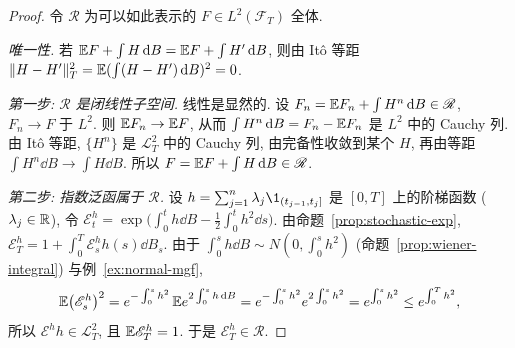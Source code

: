 \begin{proof}
令 $\mathscr{R}$ 为可以如此表示的 $F\in L^2(\mathcal{F}_T)$ 全体.

\emph{唯一性.} 若 $\mathbb{E} F+\int H\mathop{}\!\mathrm{d} B=\mathbb{E} F+\int H'\mathop{}\!\mathrm{d} B$, 则由 It\^o 等距 $\lVert H-H'\rVert_T^2=\mathbb{E}(\int(H-H')\mathop{}\!\mathrm{d} B)^2=0$.

\emph{第一步: $\mathscr{R}$ 是闭线性子空间.} 线性是显然的. 设 $F_n=\mathbb{E} F_n+\int H^n\mathop{}\!\mathrm{d} B\in\mathscr{R}$, $F_n\to F$ 于 $L^2$. 则 $\mathbb{E} F_n\to\mathbb{E} F$, 从而 $\int H^n\mathop{}\!\mathrm{d} B=F_n-\mathbb{E} F_n$ 是 $L^2$ 中的 Cauchy 列. 由 It\^o 等距, $\{H^n\}$ 是 $\mathscr{L}^2_T$ 中的 Cauchy 列, 由完备性收敛到某个 $H$, 再由等距 $\int H^n\dd B\to\int H\dd B$. 所以 $F=\mathbb{E} F+\int H\mathop{}\!\mathrm{d} B\in\mathscr{R}$.

\emph{第二步: 指数泛函属于 $\mathscr{R}$.} 设 $h=\sum_{j=1}^n\lambda_j\1_{(t_{j-1},t_j]}$ 是 $[0,T]$ 上的阶梯函数 ($\lambda_j\in\mathbb{R}$), 令 $\mathscr{E}^h_t=\exp\big(\int_0^th\dd B-\frac{1}{2}\int_0^th^2\dd s\big)$. 由命题~\ref{prop:stochastic-exp}, $\mathscr{E}^h_T=1+\int_0^T\mathscr{E}^h_sh(s)\dd B_s$. 由于 $\int_0^sh\dd B\sim N(0,\int_0^sh^2)$ (命题~\ref{prop:wiener-integral}) 与例~\ref{ex:normal-mgf},
\[
\mathbb{E}\big(\mathscr{E}^h_s\big)^2=e^{-\int_0^sh^2}\,\mathbb{E} e^{2\int_0^sh\mathop{}\!\mathrm{d} B}=e^{-\int_0^sh^2}e^{2\int_0^sh^2}=e^{\int_0^sh^2}\le e^{\int_0^Th^2},
\]
所以 $\mathscr{E}^hh\in\mathscr{L}^2_T$, 且 $\mathbb{E}\mathscr{E}^h_T=1$. 于是 $\mathscr{E}^h_T\in\mathscr{R}$.


\end{proof}
